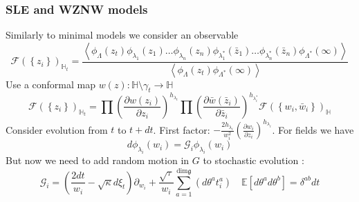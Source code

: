 \documentclass[pdftex]{beamer}
\newcommand{\gf}{\mathfrak{g}}
\theoremstyle{definition} \newtheorem{Def}{Definition}
\begin{document}
\begin{frame}
  \frametitle{SLE and WZNW models}
  Similarly to minimal models we consider an observable
  \begin{equation*}
    \mathcal{F}(\left\{z_{i}\right\})_{\mathbb{H}_{t}}=
    \frac{\left<\phi_{\Lambda}(z_{t}) \phi_{\lambda_1}(z_{1}) \dots \phi_{\lambda_n}(z_{n}) \phi_{\lambda^{*}_1}(\bar z_{1}) \dots \phi_{\lambda^{*}_n}(\bar z_{n})
        \phi_{\Lambda^{*}}(\infty)\right>}{\left<\phi_{\Lambda}(z_{t})\phi_{\Lambda^{*}}(\infty)\right>}
  \end{equation*}
  Use a conformal map $w(z):\mathbb{H}\setminus\gamma_{t}\to \mathbb{H}$
  \begin{equation*}
    \mathcal{F}(\left\{z_{i}\right\})_{\mathbb{H}_{t}}=\prod \left(\frac{\partial w(z_{i})}{\partial z_{i}}\right)^{h_{\lambda_i}} 
    \prod \left(\frac{\partial \bar w(\bar z_{i})}{\partial \bar z_{i}}\right)^{h_{\lambda^{*}_i}}
        \mathcal{F}(\left\{w_{i}, \bar w_{i}\right\})_{\mathbb{H}}
  \end{equation*}
  Consider evolution from $t$ to $t+dt$. First factor: $-\frac{2h_{\lambda_{i}}}{w_{i}^{2}}\left(\frac{\partial w_{i}}{\partial z_{i}}\right)^{h_{\lambda_{i}}}$. For fields we have
  \begin{equation*}
    d\phi_{\lambda_{i}}(w_{i}) = \mathcal{G}_{i}\phi_{\lambda_{i}}(w_{i})
  \end{equation*}
  But now we need to add random motion in $G$ to stochastic evolution \cite{bettelheim2005stochastic}:
  \begin{equation*}
    \mathcal{G}_{i}=\left(\frac{2dt}{w_{i}}-\sqrt{\kappa}
      d\xi_{t}\right) \partial_{w_{i}}+\frac{\sqrt{\tau}}{w_{i}}\sum_{a=1}^{\mathrm{dim} \gf}\left(d
      \theta ^{a} t^{a}_{i}\right)\quad \mathbb{E}[d\theta^{a} d\theta^{b}]=\delta^{ab} dt
  \end{equation*}
\end{frame}
\end{document}
